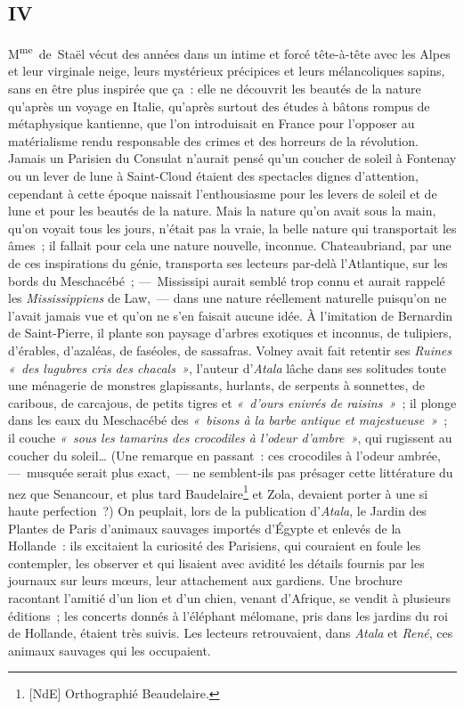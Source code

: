 \documentclass[french,twoside]{book} %
\begin{document}
\subsection[{IV}]{IV}
\noindent M\textsuperscript{me} de Staël vécut des années dans un intime et forcé tête-à-tête avec les Alpes et leur virginale neige, leurs mystérieux précipices et leurs mélancoliques sapins, sans en être plus inspirée que ça : elle ne découvrit les beautés de la nature qu’après un voyage en Italie, qu’après surtout des études à bâtons rompus de métaphysique kantienne, que l’on introduisait en France pour l’opposer au matérialisme rendu responsable des crimes et des horreurs de la révolution. Jamais un Parisien du Consulat n’aurait pensé qu’un coucher de soleil à Fontenay ou un lever de lune à Saint-Cloud étaient des spectacles dignes d’attention, cependant à cette époque naissait l’enthousiasme pour les levers de soleil et de lune et pour les beautés de la nature. Mais la nature qu’on avait sous la main, qu’on voyait tous les jours, n’était pas la vraie, la belle nature qui transportait les âmes ; il fallait pour cela une nature nouvelle, inconnue. Chateaubriand, par une de ces inspirations du génie, transporta ses lecteurs par-delà l’Atlantique, sur les bords du Meschacébé ; — Mississipi aurait semblé trop connu et aurait rappelé les \emph{Mississippiens} de Law, — dans une nature réellement naturelle puisqu’on ne l’avait jamais vue et qu’on ne s’en faisait aucune idée. À l’imitation de Bernardin de Saint-Pierre, il plante son paysage d’arbres exotiques et inconnus, de tulipiers, d’érables, d’azaléas, de faséoles, de sassafras. Volney avait fait retentir ses \emph{Ruines} \emph{« des  
\label{p597}lugubres cris des chacals »}, l’auteur d’\emph{Atala} lâche dans ses solitudes toute une ménagerie de monstres glapissants, hurlants, de serpents à sonnettes, de caribous, de carcajous, de petits tigres et \emph{« d’ours enivrés de raisins »} ; il plonge dans les eaux du Meschacébé des \emph{« bisons à la barbe antique et majestueuse »} ; il couche \emph{« sous les tamarins des crocodiles à l’odeur d’ambre »}, qui rugissent au coucher du soleil… (Une remarque en passant : ces crocodiles à l’odeur ambrée, — musquée serait plus exact, — ne semblent-ils pas présager cette littérature du nez que Senancour, et plus tard Baudelaire\footnote{[NdE] Orthographié Beaudelaire.} et Zola, devaient porter à une si haute perfection ?) On peuplait, lors de la publication d’\emph{Atala}, le Jardin des Plantes de Paris d’animaux sauvages importés d’Égypte et enlevés de la Hollande : ils excitaient la curiosité des Parisiens, qui couraient en foule les contempler, les observer et qui lisaient avec avidité les détails fournis par les journaux sur leurs mœurs, leur attachement aux gardiens. Une brochure racontant l’amitié d’un lion et d’un chien, venant d’Afrique, se vendit à plusieurs éditions ; les concerts donnés à l’éléphant mélomane, pris dans les jardins du roi de Hollande, étaient très suivis. Les lecteurs retrouvaient, dans \emph{Atala} et \emph{René}, ces animaux sauvages qui les occupaient.\par
\end{document}
